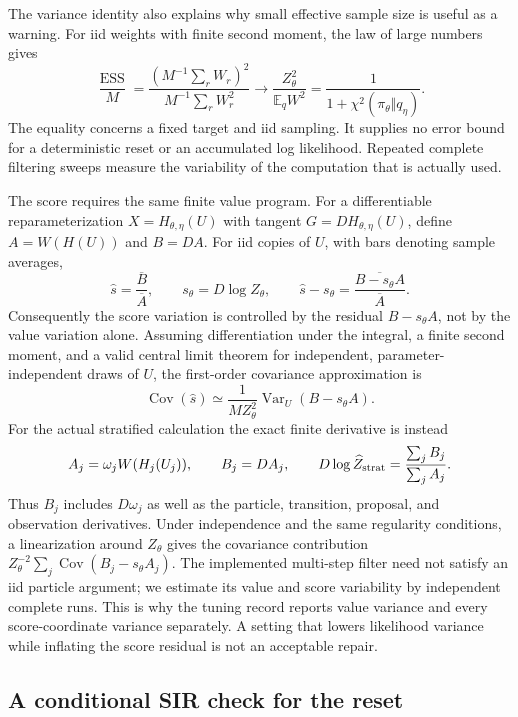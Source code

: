 The variance identity also explains why small effective sample size is useful
as a warning. For iid weights with finite second moment, the law of large
numbers gives
\[
 \frac{\operatorname{ESS}}{M}
 =\frac{(M^{-1}\sum_r W_r)^2}{M^{-1}\sum_r W_r^2}
 \longrightarrow \frac{Z_\theta^2}{\mathbb E_q W^2}
 =\frac{1}{1+\chi^2(\pi_\theta\Vert q_\eta)}.
\]
The equality concerns a fixed target and iid sampling. It supplies no error
bound for a deterministic reset or an accumulated log likelihood. Repeated
complete filtering sweeps measure the variability of the computation that is
actually used.

The score requires the same finite value program. For a differentiable
reparameterization
$X=H_{\theta,\eta}(U)$ with tangent $G=D H_{\theta,\eta}(U)$, define
$A=W(H(U))$ and $B=D A$.  For iid copies of $U$, with bars denoting sample averages,
\[
 \widehat s=\frac{\overline B}{\overline A},\qquad
 s_\theta=D\log Z_\theta,\qquad
 \widehat s-s_\theta
 =\frac{\overline{B-s_\theta A}}{\overline A}.
\]
Consequently the score variation is controlled by the residual
$B-s_\theta A$, not by the value variation alone.  Assuming differentiation under the integral, a finite second moment, and
a valid central limit theorem for independent, parameter-independent draws of $U$, the first-order
covariance approximation is
\begin{equation}
 \operatorname{Cov}(\widehat s)\simeq\frac{1}{MZ_\theta^2}
   \operatorname{Var}_{U}\!\left(B-s_\theta A\right).
 \label{eq:bf-hd-score-residual-variance}
\end{equation}
For the actual stratified calculation the exact finite derivative is instead
\[
 A_j=\omega_j W(H_j(U_j)),\qquad B_j=D A_j,\qquad
 D\log\widehat Z_{\rm strat}=\frac{\sum_j B_j}{\sum_j A_j}.
\]
Thus $B_j$ includes $D\omega_j$ as well as the particle, transition, proposal,
and observation derivatives. Under independence and the same regularity
conditions, a linearization around $Z_\theta$ gives the covariance contribution
$Z_\theta^{-2}\sum_j\operatorname{Cov}(B_j-s_\theta A_j)$.
The implemented multi-step filter need not satisfy an iid particle argument;
we estimate its value and score variability by independent complete runs.
This is why the tuning record reports value variance and every score-coordinate
variance separately.  A setting that lowers likelihood variance while inflating
the score residual is not an acceptable repair.

\subsection{A conditional SIR check for the reset}

